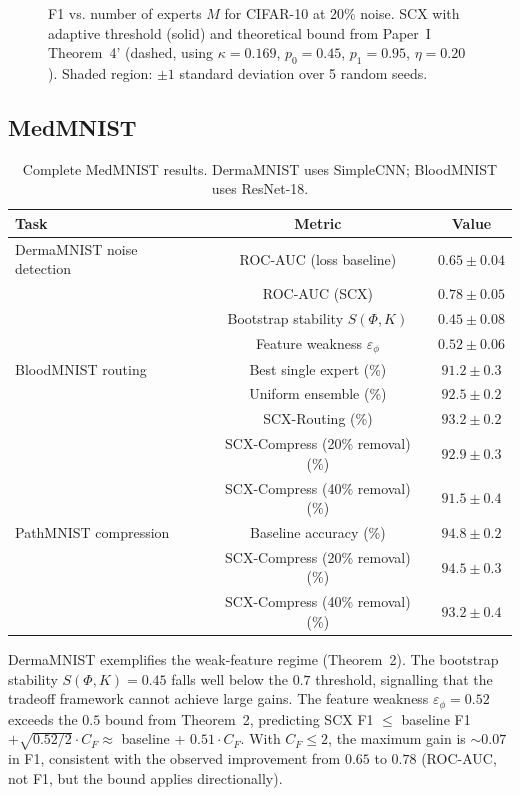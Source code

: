 \documentclass[11pt]{article}
\begin{document}
\begin{figure}[h]
\centering
\caption{F1 vs. number of experts $M$ for CIFAR-10 at 20\% noise. SCX with adaptive threshold (solid) and theoretical bound from Paper~I Theorem~4' (dashed, using $\kappa=0.169$, $p_0=0.45$, $p_1=0.95$, $\eta=0.20$). Shaded region: $\pm 1$ standard deviation over 5 random seeds.}
\label{fig:cifar_m_ablation}
\end{figure}

\subsection{MedMNIST}

\begin{table}[h]
\centering
\caption{Complete MedMNIST results. DermaMNIST uses SimpleCNN; BloodMNIST uses ResNet-18.}
\label{tab:medmnist_full}
\begin{tabular}{lcc}
\hline
Task & Metric & Value \\
\hline
DermaMNIST noise detection & ROC-AUC (loss baseline) & $0.65 \pm 0.04$ \\
 & ROC-AUC (SCX) & $0.78 \pm 0.05$ \\
 & Bootstrap stability $S(\Phi, K)$ & $0.45 \pm 0.08$ \\
 & Feature weakness $\varepsilon_\phi$ & $0.52 \pm 0.06$ \\
\hline
BloodMNIST routing & Best single expert (\%) & $91.2 \pm 0.3$ \\
 & Uniform ensemble (\%) & $92.5 \pm 0.2$ \\
 & SCX-Routing (\%) & $93.2 \pm 0.2$ \\
 & SCX-Compress (20\% removal) (\%) & $92.9 \pm 0.3$ \\
 & SCX-Compress (40\% removal) (\%) & $91.5 \pm 0.4$ \\
\hline
PathMNIST compression & Baseline accuracy (\%) & $94.8 \pm 0.2$ \\
 & SCX-Compress (20\% removal) (\%) & $94.5 \pm 0.3$ \\
 & SCX-Compress (40\% removal) (\%) & $93.2 \pm 0.4$ \\
\hline
\end{tabular}
\end{table}

DermaMNIST exemplifies the weak-feature regime (Theorem~2). The bootstrap stability $S(\Phi, K) = 0.45$ falls well below the $0.7$ threshold, signalling that the tradeoff framework cannot achieve large gains. The feature weakness $\varepsilon_\phi = 0.52$ exceeds the $0.5$ bound from Theorem~2, predicting SCX F1 $\leq$ baseline F1 $+ \sqrt{0.52/2} \cdot C_F \approx$ baseline + $0.51 \cdot C_F$. With $C_F \leq 2$, the maximum gain is $\sim 0.07$ in F1, consistent with the observed improvement from $0.65$ to $0.78$ (ROC-AUC, not F1, but the bound applies directionally).
\end{document}

